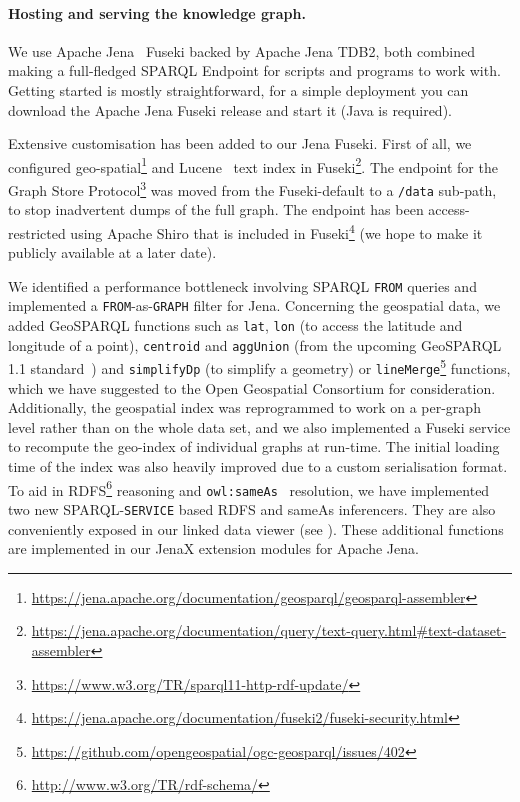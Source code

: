 \documentclass[
hf
]{ceurart}
\begin{document}
\paragraph{Hosting and serving the knowledge graph.}\label{para:server}
We use Apache Jena~\cite{carroll2004jena} Fuseki backed by Apache Jena TDB2, both combined making a full-fledged SPARQL Endpoint for scripts and programs to work with. Getting started is mostly straightforward, for a simple deployment you can download the Apache Jena Fuseki release and start it (Java is required). 

Extensive customisation has been added to our Jena Fuseki. First of all, we configured geo-spatial\footnote{\url{https://jena.apache.org/documentation/geosparql/geosparql-assembler}} and Lucene~\cite{bialecki2012apache} text index in Fuseki\footnote{\url{https://jena.apache.org/documentation/query/text-query.html\#text-dataset-assembler}}. The endpoint for the Graph Store Protocol\footnote{\url{https://www.w3.org/TR/sparql11-http-rdf-update/}} was moved from the Fuseki-default to a \texttt{/data} sub-path, to stop inadvertent dumps of the full graph. The endpoint has been access-restricted using Apache Shiro that is included in Fuseki\footnote{\url{https://jena.apache.org/documentation/fuseki2/fuseki-security.html}} (we hope to make it publicly available at a later date).

We identified a performance bottleneck involving SPARQL \texttt{FROM} queries and implemented a \texttt{FROM}-as-\texttt{GRAPH} filter for Jena. Concerning the geospatial data, we added GeoSPARQL functions such as \texttt{lat}, \texttt{lon} (to access the latitude and longitude of a point), \texttt{centroid} and \texttt{aggUnion} (from the upcoming GeoSPARQL 1.1 standard~\cite{car2022geosparql}) and \texttt{simplifyDp} (to simplify a geometry) or \texttt{lineMerge}\footnote{\url{https://github.com/opengeospatial/ogc-geosparql/issues/402}} functions, which we have suggested to the Open Geospatial Consortium for consideration. Additionally, the geospatial index was reprogrammed to work on a per-graph level rather than on the whole data set, and we also implemented a Fuseki service to recompute the geo-index of individual graphs at run-time. The initial loading time of the index was also heavily improved due to a custom serialisation format.
%
To aid in RDFS\footnote{\url{http://www.w3.org/TR/rdf-schema/}} reasoning and \texttt{owl:sameAs}~\cite{motik2015handling} resolution, we have implemented two new SPARQL-\texttt{SERVICE} based RDFS and sameAs inferencers. They are also conveniently exposed in our linked data viewer (see ).
%
These additional functions are implemented in our JenaX extension modules for Apache Jena.
\end{document}
